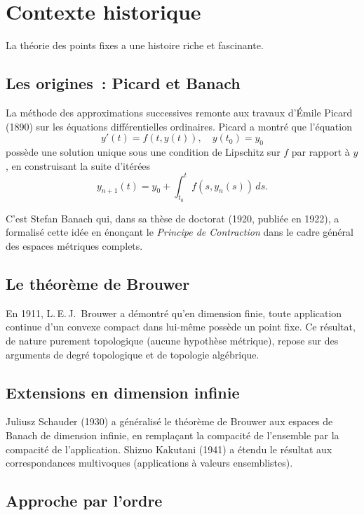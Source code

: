 \section{Contexte historique}

La th\'eorie des points fixes a une histoire riche et fascinante.

\subsection{Les origines~: Picard et Banach}

La m\'ethode des approximations successives remonte aux travaux d'\'Emile Picard
(1890) sur les \'equations diff\'erentielles ordinaires. Picard a montr\'e que
l'\'equation
\[
    y'(t) = f(t, y(t)), \quad y(t_0) = y_0
\]
poss\`ede une solution unique sous une condition de Lipschitz sur $f$ par rapport
\`a $y$, en construisant la suite d'it\'er\'ees
\[
    y_{n+1}(t) = y_0 + \int_{t_0}^{t} f(s, y_n(s)) \, ds.
\]

C'est Stefan Banach qui, dans sa th\`ese de doctorat (1920, publi\'ee en 1922),
a formalis\'e cette id\'ee en \'enon\c{c}ant le \emph{Principe de Contraction} dans
le cadre g\'en\'eral des espaces m\'etriques complets.

\subsection{Le th\'eor\`eme de Brouwer}

En 1911, L.\,E.\,J.\ Brouwer a d\'emontr\'e qu'en dimension finie, toute
application continue d'un convexe compact dans lui-m\^eme poss\`ede un point fixe.
Ce r\'esultat, de nature purement topologique (aucune hypoth\`ese m\'etrique),
repose sur des arguments de degr\'e topologique et de topologie alg\'ebrique.

\subsection{Extensions en dimension infinie}

Juliusz Schauder (1930) a g\'en\'eralis\'e le th\'eor\`eme de Brouwer aux espaces de
Banach de dimension infinie, en rempla\c{c}ant la compacit\'e de l'ensemble par
la compacit\'e de l'application. Shizuo Kakutani (1941) a \'etendu le r\'esultat
aux correspondances multivoques (applications \`a valeurs ensemblistes).

\subsection{Approche par l'ordre}

